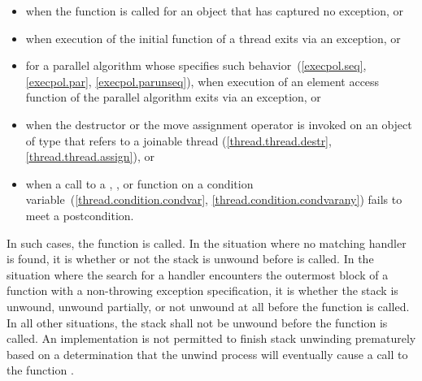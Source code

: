 \begin{note}
\begin{itemize}
\item%
when the function  is called for an object
that has captured no exception, or

\item%
when execution of the initial function of a thread exits via
an exception, or

\item%
for a parallel algorithm whose  specifies such
behavior~(\ref{execpol.seq}, \ref{execpol.par}, \ref{execpol.parunseq}),
when execution of an element access function
of the parallel algorithm exits via an exception, or

\item%
when the destructor or the move assignment operator is invoked on an object
of type  that refers to a joinable thread
(\ref{thread.thread.destr}, \ref{thread.thread.assign}), or

\item%
when a call to a , , or 
function on a condition variable~(\ref{thread.condition.condvar}, \ref{thread.condition.condvarany})
fails to meet a postcondition.

\end{itemize}

\end{note}

\pnum
{}%
In such cases,
the function 
is called.
In the situation where no matching handler is found, it is
 whether or not the
stack is unwound
before
is called.
In the situation where the search for a handler encounters the
outermost block of a function
with a non-throwing exception specification, it is
whether the stack is unwound, unwound partially, or not unwound at all
before the function  is called.
In all other situations, the stack shall not be unwound before
the function 
is called.
An implementation is not permitted to finish stack unwinding
prematurely based on a determination that the unwind process
will eventually cause a call to the function
.


